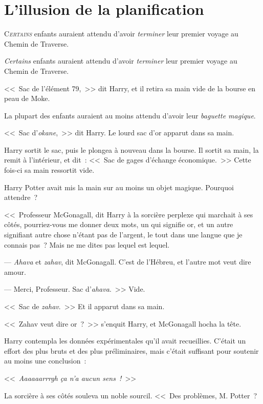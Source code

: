 \chapter{L'illusion de la planification}

\lettrine{C}{\emph{ertains}} enfants auraient attendu d'avoir \emph{terminer} leur premier voyage au Chemin de Traverse.

\emph{Certains} enfants auraient attendu d'avoir \emph{terminer} leur premier voyage au Chemin de Traverse.

<<~Sac de l'élément 79,~>> dit Harry, et il retira sa main vide de la bourse en peau de Moke.

La plupart des enfants auraient au moins attendu d'avoir leur \emph{baguette magique}.

<<~Sac d'\emph{okane},~>> dit Harry. Le lourd sac d'or apparut dans sa main.

Harry sortit le sac, puis le plongea à nouveau dans la bourse. Il sortit sa main, la remit à l'intérieur, et dit~: <<~Sac de gages d'échange économique.~>> Cette fois-ci sa main ressortit vide.

Harry Potter avait mis la main sur au moins un objet magique. Pourquoi attendre~?

<<~Professeur McGonagall, dit Harry à la sorcière perplexe qui marchait à ses côtés, pourriez-vous me donner deux mots, un qui signifie or, et un autre signifiant autre chose n'étant pas de l'argent, le tout dans une langue que je connais pas~? Mais ne me dites pas lequel est lequel.

--- \emph{Ahava} et \emph{zahav}, dit McGonagall. C'est de l'Hébreu, et l'autre mot veut dire amour.

--- Merci, Professeur. Sac d'\emph{ahava}.~>> Vide.

<<~Sac de \emph{zahav}.~>> Et il apparut dans sa main.

<<~Zahav veut dire or~?~>> s'enquit Harry, et McGonagall hocha la tête.

Harry contempla les données expérimentales qu'il avait recueillies. C'était un effort des plus bruts et des plus préliminaires, mais c'était suffisant pour soutenir au moins une conclusion~:

<<~\emph{Aaaaaarrrgh ça n'a aucun sens~!}~>>

La sorcière à ses côtés souleva un noble sourcil. <<~Des problèmes, M. Potter~?

